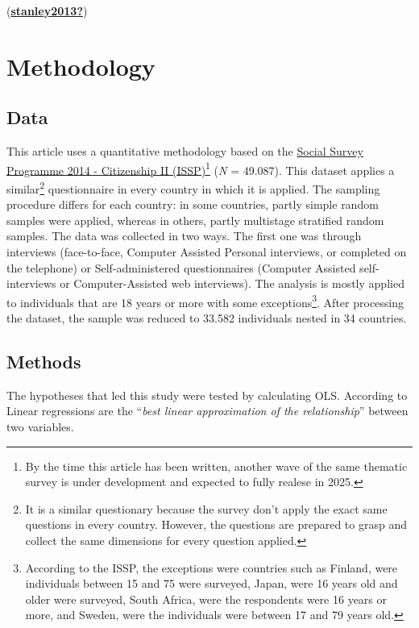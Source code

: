 \documentclass[
]{article}
\begin{document}
(\protect\hyperlink{ref-stanley2013}{\textbf{stanley2013?}})

\hypertarget{methodology}{%
\section{Methodology}\label{methodology}}

\hypertarget{data}{%
\subsection{Data}\label{data}}

This article uses a quantitative methodology based on the
\href{https://www.gesis.org/en/issp/modules/issp-modules-by-topic/citizenship/2014}{Social
Survey Programme 2014 - Citizenship II (ISSP)}\footnote{By the time this
  article has been written, another wave of the same thematic survey is
  under development and expected to fully realese in 2025.} (\emph{N} =
49.087). This dataset applies a similar\footnote{It is a similar
  questionary because the survey don't apply the exact same questions in
  every country. However, the questions are prepared to grasp and
  collect the same dimensions for every question applied.} questionnaire
in every country in which it is applied. The sampling procedure differs
for each country: in some countries, partly simple random samples were
applied, whereas in others, partly multistage stratified random samples.
The data was collected in two ways. The first one was through interviews
(face-to-face, Computer Assisted Personal interviews, or completed on
the telephone) or Self-administered questionnaires (Computer Assisted
self-interviews or Computer-Assisted web interviews). The analysis is
mostly applied to individuals that are 18 years or more with some
exceptions\footnote{According to the ISSP, the exceptions were countries
  such as Finland, were individuals between 15 and 75 were surveyed,
  Japan, were 16 years old and older were surveyed, South Africa, were
  the respondents were 16 years or more, and Sweden, were the
  individuals were between 17 and 79 years old.}. After processing the
dataset, the sample was reduced to 33.582 individuals nested in 34
countries.

\hypertarget{methods}{%
\subsection{Methods}\label{methods}}

The hypotheses that led this study were tested by calculating OLS.
According to Linear regressions are the ``\emph{best linear
approximation of the relationship}'' between two variables.
\end{document}
